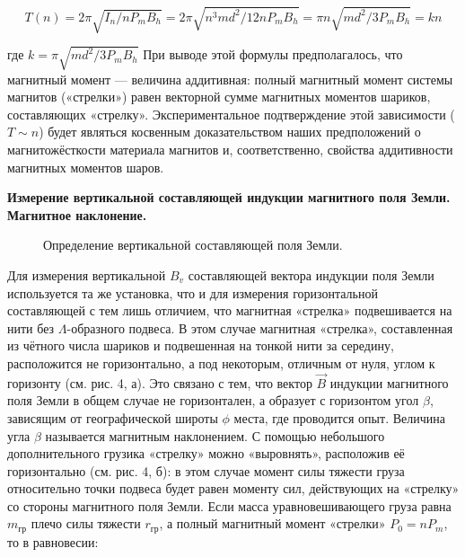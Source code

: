 \documentclass[a4paper, 12pt]{article}
\begin{document}
  \begin{center}
\begin{equation}
T(n)=2 \pi \sqrt{I_{n} / n P_{m} B_{h}}=2 \pi \sqrt{n^{3} m d^{2} / 12 n P_{m} B_{h}}=\pi n \sqrt{m d^{2} / 3 P_{m} B_{h}}=k n
\end{equation}
\end{center}

где $k=\pi \sqrt{m d^{2} / 3 P_{m} B_{h}}$
При выводе этой формулы предполагалось, что магнитный момент — величина аддитивная:
полный магнитный момент системы магнитов («стрелки») равен векторной сумме магнитных моментов шариков, составляющих «стрелку». Экспериментальное подтверждение этой зависимости ($T \sim n$) будет являться косвенным доказательством наших предположений о магнитожёсткости материала магнитов и, соответственно, свойства аддитивности магнитных моментов шаров.

\textbf{Измерение вертикальной составляющей индукции магнитного поля Земли.
Магнитное наклонение.}
\begin{figure}[h]
\caption{Определение вертикальной составляющей поля Земли.}
\label{ris:image}
\end{figure}
Для измерения вертикальной $B_v$ составляющей вектора индукции поля Земли используется та же установка, что и для измерения горизонтальной составляющей с тем лишь отличием, что магнитная «стрелка» подвешивается на нити без $\Lambda$-образного подвеса. В этом случае магнитная «стрелка», составленная из чётного числа шариков и подвешенная на тонкой нити за середину, расположится не горизонтально, а под некоторым, отличным от нуля, углом к горизонту (см. рис. 4, а). Это связано с тем, что вектор $\vec{B}$ индукции магнитного поля Земли в общем случае не горизонтален, а образует с горизонтом угол $\beta$, зависящим от географической широты $\phi$ места, где проводится опыт. Величина угла  $\beta$ называется магнитным наклонением.
С помощью небольшого дополнительного грузика «стрелку» можно «выровнять», расположив её горизонтально (см. рис. 4, б): в этом случае момент силы тяжести груза относительно точки подвеса будет равен моменту сил, действующих на «стрелку» со стороны магнитного поля Земли. Если масса уравновешивающего груза равна $m_{\text{гр}}$ плечо силы тяжести $r_{\text{гр}}$, а полный магнитный момент «стрелки» $P_0 = n P_m$, то в равновесии:
\end{document}
